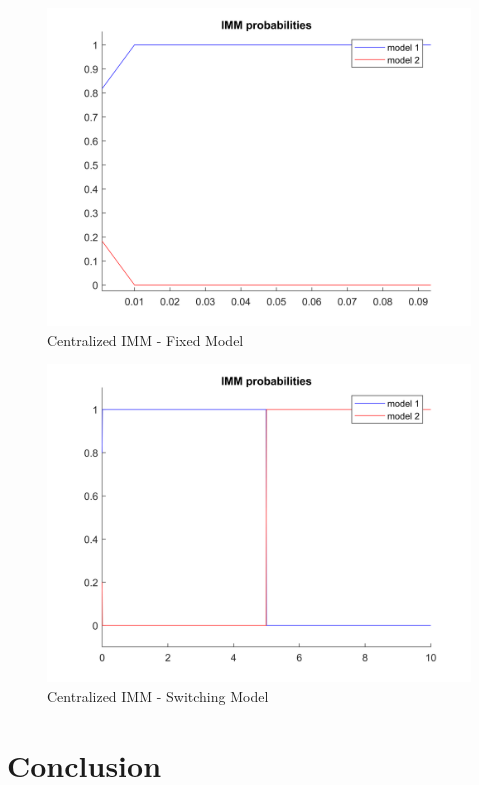 \documentclass[conference]{IEEEtran}
\begin{document}
\begin{figure}[H]
 \includegraphics[width=\linewidth]{dwg/mu-centralized1.png}
  \caption{Centralized IMM - Fixed Model}
\end{figure}
\begin{figure}[H]
 \includegraphics[width=\linewidth]{dwg/mu-centralized2.png}
  \caption{Centralized IMM - Switching Model}
 
\end{figure}


\section{Conclusion}
\end{document}
